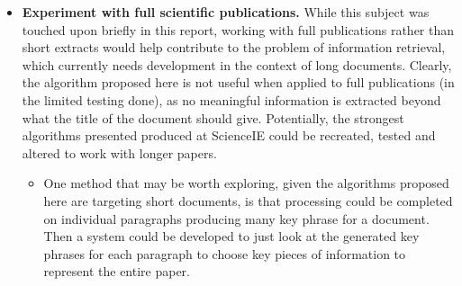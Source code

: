 \begin{itemize}
	\item \textbf{Experiment with full scientific publications.} While this subject was touched upon briefly in this report, working with full publications rather than short extracts would help contribute to the problem of information retrieval, which currently needs development in the context of long documents. Clearly, the algorithm proposed here is not useful when applied to full publications (in the limited testing done), as no meaningful information is extracted beyond what the title of the document should give. Potentially, the strongest algorithms presented produced at ScienceIE could be recreated, tested and altered to work with longer papers.
	\begin{itemize}
		\item One method that may be worth exploring, given the algorithms proposed here are targeting short documents, is that processing could be completed on individual paragraphs producing many key phrase for a document. Then a system could be developed to just look at the generated key phrases for each paragraph to choose key pieces of information to represent the entire paper.
	\end{itemize}
\end{itemize}
